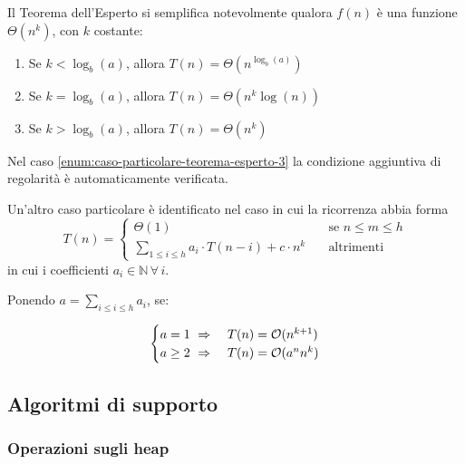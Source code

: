\documentclass[italian, 10pt]{article}
\begin{document}
Il Teorema dell'Esperto si semplifica notevolmente qualora \(f(n)\) è una funzione \(\Theta(n^k)\), con \(k\) costante:

\begin{enumerate}[label=\arabic*), ref=(\arabic*)]
  \item\label{enum:caso-particolare-teorema-esperto-1} Se \(k < \log_b(a)\), allora \(T(n) = \Theta\left(n^{\log_b(a)}\right)\)
  \item\label{enum:caso-particolare-teorema-esperto-2} Se \(k = \log_b(a)\), allora \(T(n) = \Theta\left(n^k \log{(n)}\right)\)
  \item\label{enum:caso-particolare-teorema-esperto-3} Se \(k > \log_b(a)\), allora \(T(n) = \Theta\left(n^k\right)\)
\end{enumerate}

Nel caso \ref{enum:caso-particolare-teorema-esperto-3} la condizione aggiuntiva di regolarità è automaticamente verificata.

\bigskip
Un'altro caso particolare è identificato nel caso in cui la ricorrenza abbia forma
\[T(n) = \begin{cases}
    \Theta(1) \quad                                                           & \text{se } n \leq m \leq h \\
    \displaystyle \sum_{1 \leq i \leq h} a_i \cdot T(n-i) + c \cdot n^k \quad & \text{altrimenti}
  \end{cases}\]
in cui i coefficienti \(a_i \in \mathbb{N} \, \forall \, i\).

\bigskip
Ponendo \(a = \displaystyle \sum_{i \leq i \leq h} a_i\), se:

\[\begin{cases}
    a = 1  \ \Rightarrow \      & T(n) = \mathcal{O}(n^{k+1}) \\
    a \geq 2  \  \Rightarrow \  & T(n) = \mathcal{O}(a^n n^k)
  \end{cases}\]

\subsection{Algoritmi di supporto}

\subsubsection{Operazioni sugli heap}
\end{document}

